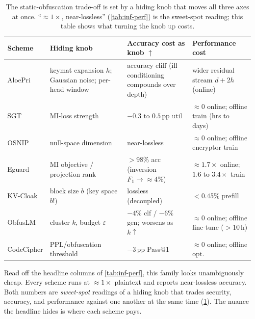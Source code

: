 \begin{table}[b!]
\centering
\caption{The static-obfuscation trade-off is set by a hiding knob that moves all three axes
at once. ``${\approx}1\times$, near-lossless'' (\cref{tab:inf-perf}) is the sweet-spot
reading; this table shows what turning the knob up costs.}
\label{tab:obfusc-tradeoffs}
\footnotesize
\setlength{\tabcolsep}{5pt}
\renewcommand{\arraystretch}{1.15}
\begin{tabularx}{\textwidth}{@{}>{\raggedright\arraybackslash}p{2.0cm}>{\raggedright\arraybackslash}X>{\raggedright\arraybackslash}X>{\raggedright\arraybackslash}X@{}}
\toprule
\textbf{Scheme} & \textbf{Hiding knob} & \textbf{Accuracy cost as knob $\uparrow$} & \textbf{Performance cost} \\
\midrule
AloePri & keymat expansion $h$; Gaussian noise; per-head window & accuracy cliff (ill-conditioning compounds over depth) & wider residual stream $d{+}2h$ (online) \\
\addlinespace[3pt]
SGT & MI-loss strength & $-0.3$ to $0.5$\,pp util & ${\approx}0$ online; offline train (hrs to days) \\
\addlinespace[3pt]
OSNIP & null-space dimension & near-lossless & ${\approx}0$ online; offline encryptor train \\
\addlinespace[3pt]
Eguard & MI objective / projection rank & ${>}98\%$ acc (inversion $F_1{\to}{\approx}4\%$) & ${\approx}1.7\times$ online; $1.6$ to $3.4\times$ train \\
\addlinespace[3pt]
KV-Cloak & block size $b$ (key space $b!$) & lossless (decoupled) & $<$0.45\% prefill \\
\addlinespace[3pt]
ObfusLM & cluster $k$, budget $\varepsilon$ & $-4\%$ clf / $-6\%$ gen; worsens as $k\uparrow$ & ${\approx}0$ online; offline fine-tune ($>$10\,h) \\
\addlinespace[3pt]
CodeCipher & PPL/obfuscation threshold & $-3$\,pp Pass@1 & ${\approx}0$ online; offline opt. \\
\bottomrule
\end{tabularx}
\end{table}

Read off the headline columns of \cref{tab:inf-perf}, this family looks unambiguously cheap.
Every scheme runs at ${\approx}1\times$ plaintext and reports near-lossless accuracy. Both
numbers are \emph{sweet-spot} readings of a hiding knob that trades security, accuracy, and
performance against one another at the same time (\cref{tab:obfusc-tradeoffs}). The nuance the
headline hides is where each scheme pays.

